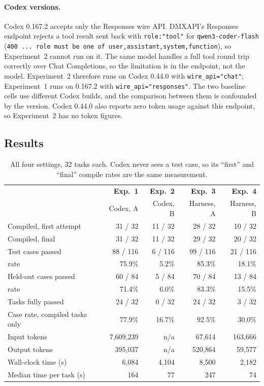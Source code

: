 \paragraph{Codex versions.}
Codex 0.167.2 accepts only the Responses wire API. DMXAPI's Responses endpoint
rejects a tool result sent back with \texttt{role:"tool"} for
\texttt{qwen3-coder-flash}
(\texttt{400 ... role must be one of user,assistant,system,function}), so
Experiment~2 cannot run on it. The same model handles a full tool round trip
correctly over Chat Completions, so the limitation is in the endpoint, not the
model. Experiment~2 therefore runs on Codex 0.44.0 with
\texttt{wire\_api="chat"}; Experiment~1 runs on 0.167.2 with
\texttt{wire\_api="responses"}. The two baseline cells use different Codex
builds, and the comparison between them is confounded by the version. Codex
0.44.0 also reports zero token usage against this endpoint, so Experiment~2 has
no token figures.

\subsection{Results}

\begin{table}[h]
\centering
\small
\begin{tabular}{@{}lrrrr@{}}
\toprule
 & \textbf{Exp.~1} & \textbf{Exp.~2} & \textbf{Exp.~3} & \textbf{Exp.~4} \\
 & Codex, A & Codex, B & Harness, A & Harness, B \\
\midrule
Compiled, first attempt      & 31 / 32 & 11 / 32 & 28 / 32 & 10 / 32 \\
Compiled, final              & 31 / 32 & 11 / 32 & 29 / 32 & 20 / 32 \\
Test cases passed            & 88 / 116 & 6 / 116 & 99 / 116 & 21 / 116 \\
\quad rate                   & 75.9\% & 5.2\% & 85.3\% & 18.1\% \\
Held-out cases passed        & 60 / 84 & 5 / 84 & 70 / 84 & 13 / 84 \\
\quad rate                   & 71.4\% & 6.0\% & 83.3\% & 15.5\% \\
Tasks fully passed           & 24 / 32 & 0 / 32 & 24 / 32 & 3 / 32 \\
Case rate, compiled tasks only & 77.9\% & 16.7\% & 92.5\% & 30.0\% \\
\midrule
Input tokens                 & 7{,}609{,}239 & n/a & 67{,}614 & 163{,}666 \\
Output tokens                & 395{,}037 & n/a & 520{,}864 & 59{,}577 \\
Wall-clock time (s)          & 6{,}084 & 4{,}104 & 8{,}500 & 2{,}182 \\
Median time per task (s)     & 164 & 77 & 247 & 74 \\
\bottomrule
\end{tabular}
\caption{All four settings, 32 tasks each. Codex never sees a test case, so
its ``first'' and ``final'' compile rates are the same measurement.}
\label{tab:main}
\end{table}

